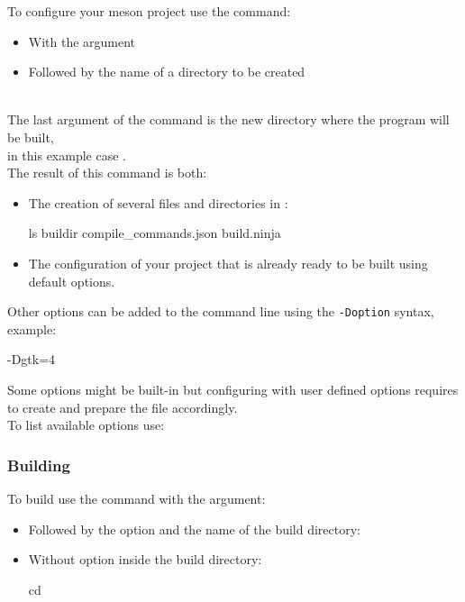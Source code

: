 To configure your meson project use the  command: 
\begin{itemize}
\item With the  argument
\item Followed by the name of a directory to be created
\end{itemize}
\vspace{-1cm}
\begin{script}
   
\end{script}
\\[-0.5cm]
\noindent The last argument of the command is the new directory where the program will be built, \\
in this example case . \\
The result of this command is both: 
\begin{itemize}
\item The creation of several files and directories in :
\begin{scripti}
 ls buildir
      compile\_commands.json  
build.ninja               
\end{scripti}
\item The configuration of your project that is already ready to be built using default options.
\end{itemize}
Other options can be added to the command line using the \texttt{-Doption} syntax, example:
\begin{script}
    -Dgtk=4
\end{script}
\noindent Some options might be built-in but configuring with user defined options requires to create and prepare the file  accordingly. \\
To list available options use: 
\begin{script}
   
\end{script}

\subsubsection*{Building}

To build use the  command with the  argument: 
\begin{itemize}
\item Followed by the option  and the name of the build directory:
\begin{scripti}
    
\end{scripti}
\item Without option inside the build directory:
\begin{scripti}
 cd 
  
\end{scripti}
\end{itemize}

